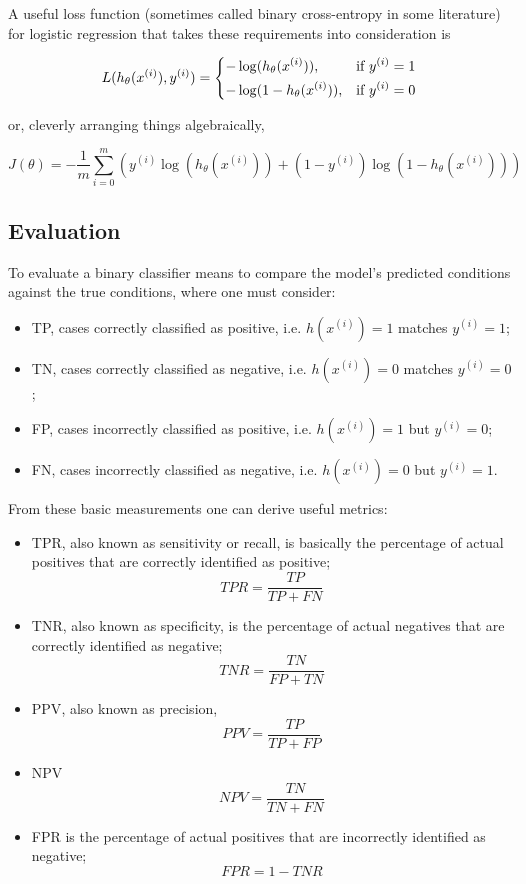 A useful loss function (sometimes called binary cross-entropy in some literature) for logistic regression that takes these requirements into consideration is

$$
L(h_{\theta}(x^{(i)}), y^{(i)}) =
\begin{dcases}
    -\log(h_{\theta}(x^{(i)})),& \text{if } y^{(i)} = 1\\
    -\log(1 - h_{\theta}(x^{(i)})),& \text{if } y^{(i)} = 0
\end{dcases}
$$

or, cleverly arranging things algebraically,

$$
J(\theta) = -\frac{1}{m} \sum_{i=0}^{m} ( y^{(i)}\log(h_{\theta}(x^{(i)})) + (1 - y^{(i)})\log(1 - h_{\theta}(x^{(i)})) )
$$

\subsection{Evaluation}

To evaluate a binary classifier means to compare the model's predicted conditions against the true conditions, where one must consider:

\begin{itemize}
    \item \ac{TP}, cases correctly classified as positive, i.e. $h(x^{(i)}) = 1$ matches $y^{(i)} = 1$;
    \item \ac{TN}, cases correctly classified as negative, i.e. $h(x^{(i)}) = 0$ matches $y^{(i)} = 0$;
    \item \ac{FP}, cases incorrectly classified as positive, i.e. $h(x^{(i)}) = 1$ but $y^{(i)} = 0$;
    \item \ac{FN}, cases incorrectly classified as negative, i.e. $h(x^{(i)}) = 0$ but $y^{(i)} = 1$.
\end{itemize}

From these basic measurements one can derive useful metrics:

\begin{itemize}
    \item \ac{TPR}, also known as sensitivity or recall, is basically the percentage of actual positives that are correctly identified as positive;
        $$TPR = \frac{TP}{TP + FN}$$
    \item \ac{TNR}, also known as specificity, is the percentage of actual negatives that are correctly identified as negative;
        $$TNR = \frac{TN}{FP + TN}$$
    \item \ac{PPV}, also known as precision,
        $$PPV = \frac{TP}{TP + FP}$$
    \item \ac{NPV}
        $$NPV = \frac{TN}{TN + FN}$$
    \item \ac{FPR} is the percentage of actual positives that are incorrectly identified as negative;
        $$FPR = 1 - TNR$$
\end{itemize}


